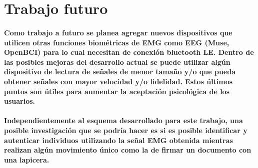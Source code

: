 \documentclass{article}
\begin{document}
\section{Trabajo futuro}
\paragraph{
Como trabajo a futuro se planea agregar nuevos dispositivos que utilicen otras funciones biométricas de EMG como EEG (Muse, OpenBCI) para lo cual necesitan de conexión bluetooth LE. Dentro de las posibles mejoras del desarrollo actual se puede utilizar algún dispositivo de lectura de señales de menor tamaño y/o que pueda obtener señales con mayor velocidad y/o fidelidad. Estos últimos puntos son útiles para aumentar la aceptación psicológica de los usuarios.
}
\paragraph{
Independientemente al esquema desarrollado para este trabajo, una posible investigación que se podría hacer es si es posible identificar y autenticar individuos utilizando la señal EMG obtenida mientras realizan algún movimiento único como la de firmar un documento con una lapicera.
}

\clearpage
\nocite{opinnovationswebsite}
\nocite{charbit2017}
\nocite{bressert2012}
\nocite{angkoon2009}
\nocite{oliphant2015}
\nocite{langtangen2016}
\nocite{hassanien2015}
\nocite{moonwon2016}
\nocite{sharma2016}
\nocite{trewin}
\nocite{chowdhury2013}
\nocite{siqueira2015}
\nocite{samsung2016}
\nocite{raez2006}
\nocite{esparza2017}
\nocite{sanei2007}
\nocite{haberman2016}

\printbibliography[heading=bibintoc,title={Bibliografía}]
\end{document}
